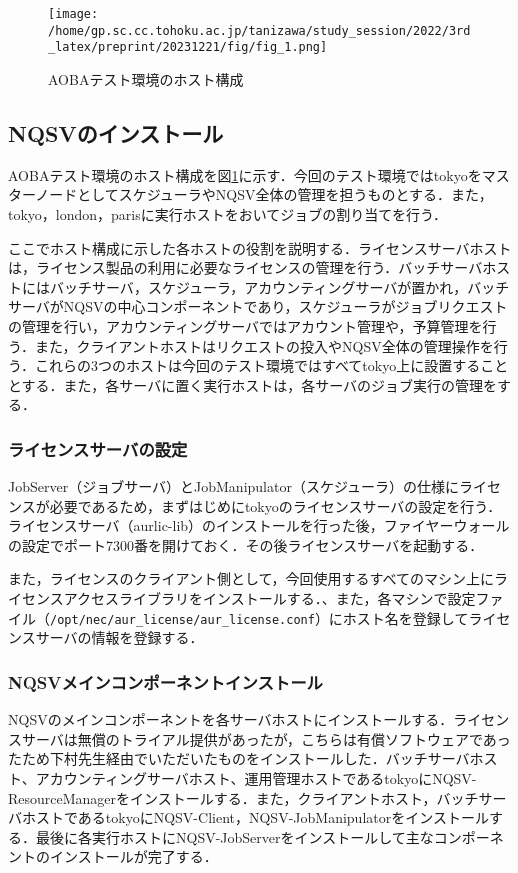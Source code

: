 \documentclass[a4paper,oneside,twocolumn,notitlepage,dvipdfmx]{jsarticle}
\begin{document}
\begin{figure}[h]
  \centering
  \texttt{[image: /home/gp.sc.cc.tohoku.ac.jp/tanizawa/study\_session/2022/3rd\_latex/preprint/20231221/fig/fig\_1.png]}
  \caption{AOBAテスト環境のホスト構成}
  \label{fig_1}
\end{figure}

\subsection{NQSVのインストール}
AOBAテスト環境のホスト構成を図\ref{fig_1}に示す．今回のテスト環境ではtokyoをマスターノードとしてスケジューラやNQSV全体の管理を担うものとする．また，tokyo，london，parisに実行ホストをおいてジョブの割り当てを行う．\par
ここでホスト構成に示した各ホストの役割を説明する．ライセンスサーバホストは，ライセンス製品の利用に必要なライセンスの管理を行う．バッチサーバホストにはバッチサーバ，スケジューラ，アカウンティングサーバが置かれ，バッチサーバがNQSVの中心コンポーネントであり，スケジューラがジョブリクエストの管理を行い，アカウンティングサーバではアカウント管理や，予算管理を行う．また，クライアントホストはリクエストの投入やNQSV全体の管理操作を行う．これらの3つのホストは今回のテスト環境ではすべてtokyo上に設置することとする．また，各サーバに置く実行ホストは，各サーバのジョブ実行の管理をする．\par



\subsubsection{ライセンスサーバの設定}
JobServer（ジョブサーバ）とJobManipulator（スケジューラ）の仕様にライセンスが必要であるため，まずはじめにtokyoのライセンスサーバの設定を行う．ライセンスサーバ（aurlic-lib）のインストールを行った後，ファイヤーウォールの設定でポート7300番を開けておく．その後ライセンスサーバを起動する．\par
また，ライセンスのクライアント側として，今回使用するすべてのマシン上にライセンスアクセスライブラリをインストールする．、また，各マシンで設定ファイル（\texttt{/opt/nec/aur\_license/aur\_license.conf}）にホスト名を登録してライセンスサーバの情報を登録する．\par

\subsubsection{NQSVメインコンポーネントインストール}
NQSVのメインコンポーネントを各サーバホストにインストールする．ライセンスサーバは無償のトライアル提供があったが，こちらは有償ソフトウェアであったため下村先生経由でいただいたものをインストールした．バッチサーバホスト、アカウンティングサーバホスト、運用管理ホストであるtokyoにNQSV-ResourceManagerをインストールする．また，クライアントホスト，バッチサーバホストであるtokyoにNQSV-Client，NQSV-JobManipulatorをインストールする．最後に各実行ホストにNQSV-JobServerをインストールして主なコンポーネントのインストールが完了する．
\end{document}
